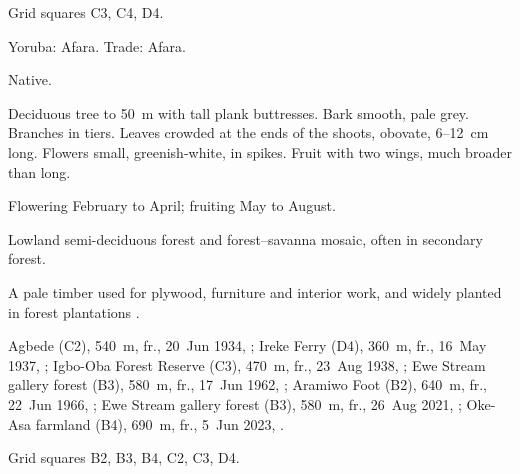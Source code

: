  Grid squares C3, C4, D4.

\begin{center}
\end{center}

\label{sp:COM02}

 Yoruba: Afara. Trade: Afara.

 Native.

 Deciduous tree to 50~m with tall plank buttresses.
Bark smooth, pale grey. Branches in tiers. Leaves crowded at the ends
of the shoots, obovate, 6--12~cm long. Flowers small, greenish-white,
in spikes. Fruit with two wings, much broader than long.

 Flowering February to April; fruiting May to August.

 Lowland semi-deciduous forest and forest--savanna
mosaic, often in secondary forest.

 A pale timber used for plywood, furniture and interior
work, and widely planted in forest plantations
\citep{keay1989,louppe2008}.

 Agbede (C2), 540~m, fr., 20~Jun 1934, ;
Ireke Ferry (D4), 360~m, fr., 16~May 1937, ;
Igbo-Oba Forest Reserve (C3), 470~m, fr., 23~Aug 1938, ;
Ewe Stream gallery forest (B3), 580~m, fr., 17~Jun 1962, ;
Aramiwo Foot (B2), 640~m, fr., 22~Jun 1966, ;
Ewe Stream gallery forest (B3), 580~m, fr., 26~Aug 2021, ;
Oke-Asa farmland (B4), 690~m, fr., 5~Jun 2023, .

 Grid squares B2, B3, B4, C2, C3, D4.

\begin{center}
\end{center}
